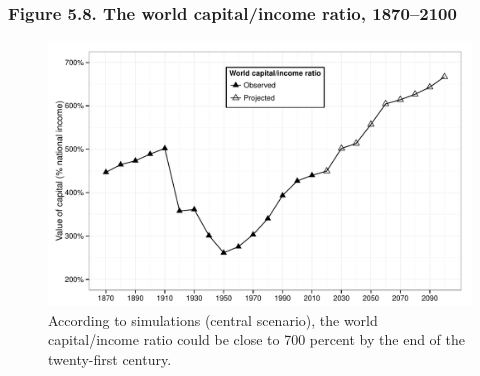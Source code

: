 \documentclass[t]{beamer}\usepackage[]{graphicx}\usepackage[]{color}
\newenvironment{knitrout}{}{} %
\begin{document}
\begin{frame}[label=Figure_5_8]
\frametitle{Figure 5.8. The world capital/income ratio, 1870--2100}
\begin{figure}[t]
\begin{minipage}[b]{\textwidth}
\centering
\begin{knitrout}\footnotesize
{}\color{fgcolor}

{\centering \includegraphics[width=1\linewidth]{figures/bw/Figure_5_8} 

}



\end{knitrout}
\caption{According to simulations (central scenario), the world capital/income ratio could be close to 700 percent by the end of the twenty-first century.}
\end{minipage}
\end{figure}
\end{frame}
\end{document}
